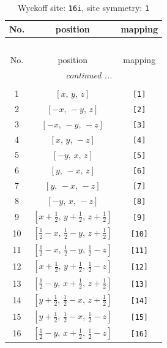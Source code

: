 \documentclass[fleqn,8pt]{jsarticle}
\begin{document}
\begin{longtable}{ccc}
\caption{Wyckoff site: {\tt 16i}, site symmetry: {\tt 1}}
 \\
 \hline \hline
No. & position & mapping \\ \hline \endfirsthead

\multicolumn{2}{l}{\tablename\ \thetable{}} \\
 \hline \hline
No. & position & mapping \\ \hline \endhead

 \hline \hline
\multicolumn{2}{r}{\footnotesize\it continued ...} \\ \endfoot

 \hline \hline
\multicolumn{2}{r}{} \\ \endlastfoot

1 & $\left[ x,\, y,\, z \right]$ & {\tt [1]} \\ \hline
2 & $\left[ - x,\, - y,\, z \right]$ & {\tt [2]} \\ \hline
3 & $\left[ - x,\, - y,\, - z \right]$ & {\tt [3]} \\ \hline
4 & $\left[ x,\, y,\, - z \right]$ & {\tt [4]} \\ \hline
5 & $\left[ - y,\, x,\, z \right]$ & {\tt [5]} \\ \hline
6 & $\left[ y,\, - x,\, z \right]$ & {\tt [6]} \\ \hline
7 & $\left[ y,\, - x,\, - z \right]$ & {\tt [7]} \\ \hline
8 & $\left[ - y,\, x,\, - z \right]$ & {\tt [8]} \\ \hline
9 & $\left[ x + \frac{1}{2},\, y + \frac{1}{2},\, z + \frac{1}{2} \right]$ & {\tt [9]} \\ \hline
10 & $\left[ \frac{1}{2} - x,\, \frac{1}{2} - y,\, z + \frac{1}{2} \right]$ & {\tt [10]} \\ \hline
11 & $\left[ \frac{1}{2} - x,\, \frac{1}{2} - y,\, \frac{1}{2} - z \right]$ & {\tt [11]} \\ \hline
12 & $\left[ x + \frac{1}{2},\, y + \frac{1}{2},\, \frac{1}{2} - z \right]$ & {\tt [12]} \\ \hline
13 & $\left[ \frac{1}{2} - y,\, x + \frac{1}{2},\, z + \frac{1}{2} \right]$ & {\tt [13]} \\ \hline
14 & $\left[ y + \frac{1}{2},\, \frac{1}{2} - x,\, z + \frac{1}{2} \right]$ & {\tt [14]} \\ \hline
15 & $\left[ y + \frac{1}{2},\, \frac{1}{2} - x,\, \frac{1}{2} - z \right]$ & {\tt [15]} \\ \hline
16 & $\left[ \frac{1}{2} - y,\, x + \frac{1}{2},\, \frac{1}{2} - z \right]$ & {\tt [16]} \\
\end{longtable}
\end{document}
